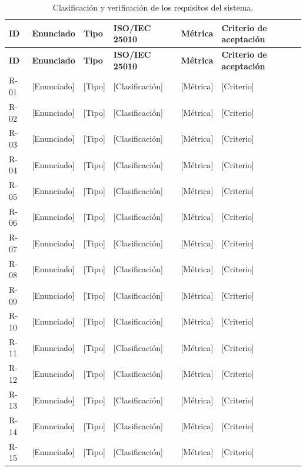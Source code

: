 \documentclass[11pt,a4paper]{article}
\newcommand{\campo}[1]{\textcolor{placeholder}{[#1]}}
\begin{document}
{\small
\begin{longtable}{@{}L{0.9cm}L{4.0cm}L{1.85cm}L{2.6cm}L{2.1cm}L{3.35cm}@{}}
\caption{Clasificación y verificación de los requisitos del sistema.}\label{tab:requisitos}\\
\toprule
\textbf{ID} & \textbf{Enunciado} & \textbf{Tipo} &
\textbf{ISO/IEC 25010} & \textbf{Métrica} & \textbf{Criterio de aceptación} \\
\midrule
\endfirsthead
\toprule
\textbf{ID} & \textbf{Enunciado} & \textbf{Tipo} &
\textbf{ISO/IEC 25010} & \textbf{Métrica} & \textbf{Criterio de aceptación} \\
\midrule
\endhead
\bottomrule
\endfoot
R-01 & \campo{Enunciado} & \campo{Tipo} & \campo{Clasificación} & \campo{Métrica} & \campo{Criterio} \\
R-02 & \campo{Enunciado} & \campo{Tipo} & \campo{Clasificación} & \campo{Métrica} & \campo{Criterio} \\
R-03 & \campo{Enunciado} & \campo{Tipo} & \campo{Clasificación} & \campo{Métrica} & \campo{Criterio} \\
R-04 & \campo{Enunciado} & \campo{Tipo} & \campo{Clasificación} & \campo{Métrica} & \campo{Criterio} \\
R-05 & \campo{Enunciado} & \campo{Tipo} & \campo{Clasificación} & \campo{Métrica} & \campo{Criterio} \\
R-06 & \campo{Enunciado} & \campo{Tipo} & \campo{Clasificación} & \campo{Métrica} & \campo{Criterio} \\
R-07 & \campo{Enunciado} & \campo{Tipo} & \campo{Clasificación} & \campo{Métrica} & \campo{Criterio} \\
R-08 & \campo{Enunciado} & \campo{Tipo} & \campo{Clasificación} & \campo{Métrica} & \campo{Criterio} \\
R-09 & \campo{Enunciado} & \campo{Tipo} & \campo{Clasificación} & \campo{Métrica} & \campo{Criterio} \\
R-10 & \campo{Enunciado} & \campo{Tipo} & \campo{Clasificación} & \campo{Métrica} & \campo{Criterio} \\
R-11 & \campo{Enunciado} & \campo{Tipo} & \campo{Clasificación} & \campo{Métrica} & \campo{Criterio} \\
R-12 & \campo{Enunciado} & \campo{Tipo} & \campo{Clasificación} & \campo{Métrica} & \campo{Criterio} \\
R-13 & \campo{Enunciado} & \campo{Tipo} & \campo{Clasificación} & \campo{Métrica} & \campo{Criterio} \\
R-14 & \campo{Enunciado} & \campo{Tipo} & \campo{Clasificación} & \campo{Métrica} & \campo{Criterio} \\
R-15 & \campo{Enunciado} & \campo{Tipo} & \campo{Clasificación} & \campo{Métrica} & \campo{Criterio} \\
\end{longtable}
}
\end{document}
